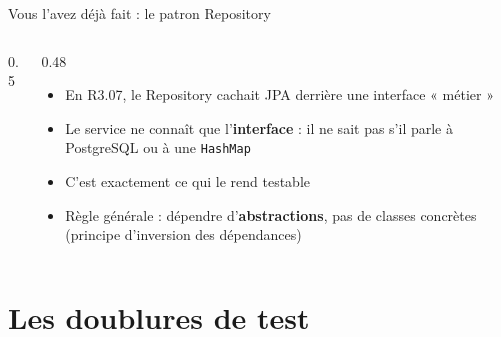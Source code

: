 \documentclass[aspectratio=169,10pt]{beamer}
\begin{document}
\begin{frame}{Vous l'avez déjà fait : le patron Repository}
  \begin{columns}[c]
    \begin{column}{0.5\textwidth}
      \begin{center}
      \end{center}
    \end{column}
    \begin{column}{0.48\textwidth}
      \begin{itemize}
        \item En R3.07, le Repository cachait JPA derrière une interface « métier »
        \item Le service ne connaît que l'\textbf{interface} : il ne sait pas s'il parle à PostgreSQL ou à une \texttt{HashMap}
        \item C'est exactement ce qui le rend testable
        \item Règle générale : dépendre d'\textbf{abstractions}, pas de classes concrètes (principe d'inversion des dépendances)
      \end{itemize}
    \end{column}
  \end{columns}
\end{frame}

\section{Les doublures de test}
\end{document}
